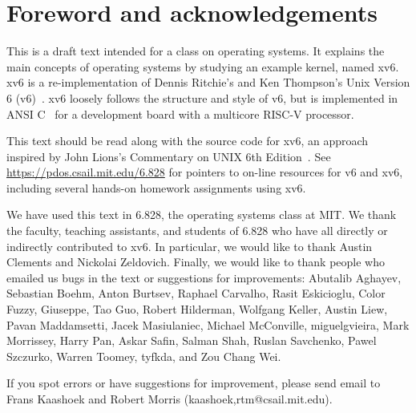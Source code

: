 \chapter*{Foreword and acknowledgements}


This is a draft text intended for a class on operating systems. It
explains the main concepts of operating systems by studying an example
kernel, named xv6.  xv6 is a re-implementation of Dennis Ritchie's and
Ken Thompson's Unix Version 6 (v6)~\cite{unix}.  xv6 loosely follows the structure
and style of v6, but is implemented in ANSI C~\cite{kernighan} for a development board
with a multicore RISC-V processor.

This text should be read along with the source code for xv6, an approach 
inspired by John Lions's Commentary on UNIX 6th Edition~\cite{lions}. See
\url{https://pdos.csail.mit.edu/6.828} for pointers to on-line
resources for v6 and xv6, including several hands-on homework assignments
using xv6.

We have used this text in 6.828, the operating systems class at MIT.  We thank
the faculty, teaching assistants, and students of 6.828 who have all directly or
indirectly contributed to xv6.  In particular, we would like to thank Austin
Clements and Nickolai Zeldovich.  Finally, we would like to thank people who
emailed us bugs in the text or suggestions for improvements: Abutalib Aghayev,
Sebastian Boehm, Anton Burtsev, Raphael Carvalho, Rasit Eskicioglu, Color Fuzzy,
Giuseppe, Tao Guo, Robert Hilderman, Wolfgang Keller, Austin Liew, Pavan
Maddamsetti, Jacek Masiulaniec, Michael McConville, miguelgvieira, Mark
Morrissey, Harry Pan, Askar Safin, Salman Shah, Ruslan Savchenko, Pawel
Szczurko, Warren Toomey, tyfkda, and Zou Chang Wei.

If you spot errors or have suggestions for improvement, please send email to
Frans Kaashoek and Robert Morris (kaashoek,rtm@csail.mit.edu).
